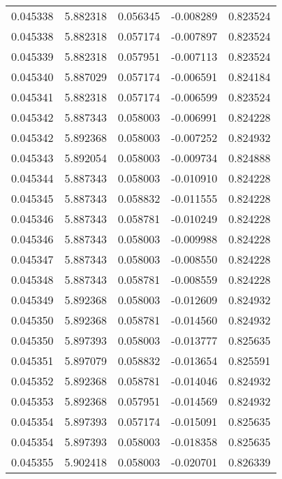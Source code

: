\begin{tabular}{lrrrr}
0.045338    &  5.882318 &  0.056345 & -0.008289 &             0.823524 \\
0.045338    &  5.882318 &  0.057174 & -0.007897 &             0.823524 \\
0.045339    &  5.882318 &  0.057951 & -0.007113 &             0.823524 \\
0.045340    &  5.887029 &  0.057174 & -0.006591 &             0.824184 \\
0.045341    &  5.882318 &  0.057174 & -0.006599 &             0.823524 \\
0.045342    &  5.887343 &  0.058003 & -0.006991 &             0.824228 \\
0.045342    &  5.892368 &  0.058003 & -0.007252 &             0.824932 \\
0.045343    &  5.892054 &  0.058003 & -0.009734 &             0.824888 \\
0.045344    &  5.887343 &  0.058003 & -0.010910 &             0.824228 \\
0.045345    &  5.887343 &  0.058832 & -0.011555 &             0.824228 \\
0.045346    &  5.887343 &  0.058781 & -0.010249 &             0.824228 \\
0.045346    &  5.887343 &  0.058003 & -0.009988 &             0.824228 \\
0.045347    &  5.887343 &  0.058003 & -0.008550 &             0.824228 \\
0.045348    &  5.887343 &  0.058781 & -0.008559 &             0.824228 \\
0.045349    &  5.892368 &  0.058003 & -0.012609 &             0.824932 \\
0.045350    &  5.892368 &  0.058781 & -0.014560 &             0.824932 \\
0.045350    &  5.897393 &  0.058003 & -0.013777 &             0.825635 \\
0.045351    &  5.897079 &  0.058832 & -0.013654 &             0.825591 \\
0.045352    &  5.892368 &  0.058781 & -0.014046 &             0.824932 \\
0.045353    &  5.892368 &  0.057951 & -0.014569 &             0.824932 \\
0.045354    &  5.897393 &  0.057174 & -0.015091 &             0.825635 \\
0.045354    &  5.897393 &  0.058003 & -0.018358 &             0.825635 \\
0.045355    &  5.902418 &  0.058003 & -0.020701 &             0.826339 \\

\end{tabular}
